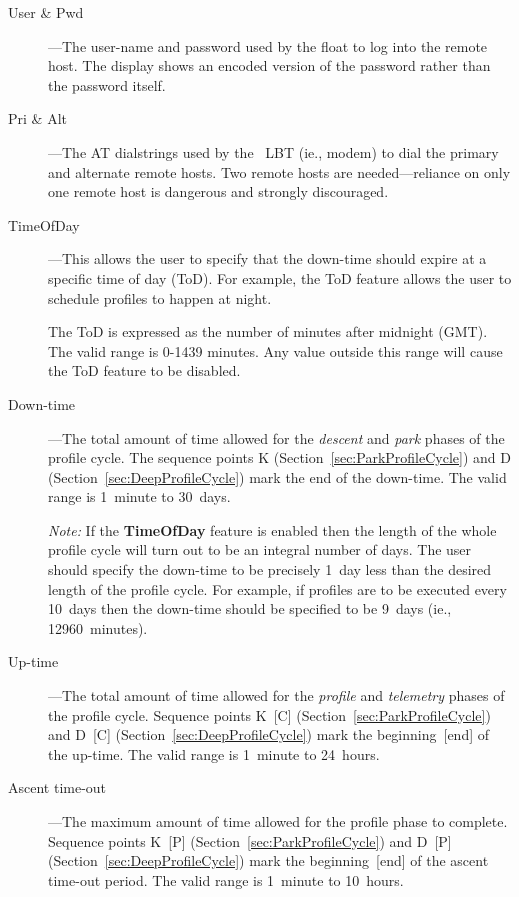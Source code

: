 \begin{description}

\item[User \& Pwd]---The user-name and password used by the float to log
  into the remote host.  The display shows an encoded version of the
  password rather than the password itself.

\item[Pri \& Alt]---The AT dialstrings used by the \iridium\ LBT (ie.,
  modem) to dial the primary and alternate remote hosts.  Two remote hosts
  are needed---reliance on only one remote host is dangerous and strongly
  discouraged.

\item[TimeOfDay]---This allows the user to specify that the down-time should
  expire at a specific time of day (ToD).  For example, the ToD feature
  allows the user to schedule profiles to happen at night.

  The ToD is expressed as the number of minutes after midnight (GMT).  The
  valid range is 0-1439 minutes.  Any value outside this range will cause
  the ToD feature to be disabled.

\item[Down-time]---The total amount of time allowed for the \emph{descent}
  and \emph{park} phases of the profile cycle.  The sequence points K
  (Section~\ref{sec:ParkProfileCycle}) and D
  (Section~\ref{sec:DeepProfileCycle}) mark the end of the down-time.  The
  valid range is 1~minute to 30~days.

  \emph{Note:} If the \textbf{TimeOfDay} feature is enabled then the length
  of the whole profile cycle will turn out to be an integral number of days.
  The user should specify the down-time to be precisely 1~day less than the
  desired length of the profile cycle.  For example, if profiles are to be
  executed every 10~days then the down-time should be specified to be 9~days
  (ie., 12960~minutes).

\item[Up-time]---The total amount of time allowed for the \emph{profile} and
  \emph{telemetry} phases of the profile cycle.  Sequence points K~[C]
  (Section~\ref{sec:ParkProfileCycle}) and D~[C]
  (Section~\ref{sec:DeepProfileCycle}) mark the beginning~[end] of the
  up-time.  The valid range is 1~minute to 24~hours.

\item[Ascent time-out]---The maximum amount of time allowed for the profile
  phase to complete.  Sequence points K~[P]
  (Section~\ref{sec:ParkProfileCycle}) and D~[P]
  (Section~\ref{sec:DeepProfileCycle}) mark the beginning~[end] of the
  ascent time-out period.  The valid range is 1~minute to 10~hours.


\end{description}
